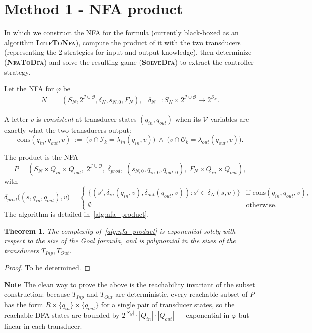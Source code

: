 \documentclass{article}
\newtheorem{theorem}{Theorem}
\newcommand{\algname}[1]{\textbf{\textsc{#1}}}
\newcommand{\Iknown}{\mathcal{I}_{k}}
\newcommand{\Oknown}{\mathcal{O}_{k}}
\newcommand{\Tin}{T_{\mathit{Inp}}}
\newcommand{\Tout}{T_{\mathit{Out}}}
\newcommand{\cons}{\mathrm{cons}}
\begin{document}
    
\section{Method 1 - NFA product}\label{nfa}
In which we construct the NFA for the formula (currently black-boxed as an algorithm \algname{LtlfToNfa}), compute the product of it with the two transducers (representing the 2 strategies for input and output knowledge), then determinize (\algname{NfaToDfa}) and solve the resulting game (\algname{SolveDfa}) to extract the controller strategy.

Let the NFA for $\varphi$ be
\begin{align*}
    N &= (S_N, 2^{\mathcal{I} \cup \mathcal{O}}, \delta_N, s_{N,0}, F_N), &
    \delta_N &: S_N \times 2^{\mathcal{I} \cup \mathcal{O}} \to 2^{S_N}.
\end{align*}

A letter $v$ is \emph{consistent} at transducer states $(q_{in}, q_{out})$ when its $\mathcal{V}$-variables are exactly what the two transducers output:
\[
    \cons(q_{in}, q_{out}, v) \;:=\;
    \big(v \cap \Iknown = \lambda_{in}(q_{in}, v)\big)
    \;\wedge\;
    \big(v \cap \Oknown = \lambda_{out}(q_{out}, v)\big).
\]

The product is the NFA
\[
    P = (S_N \times Q_{in} \times Q_{out},\; 2^{\mathcal{I} \cup \mathcal{O}},\; \delta_{prod},\; (s_{N,0}, q_{in,0}, q_{out,0}),\; F_N \times Q_{in} \times Q_{out}),
\]
with
\[
    \delta_{prod}\big((s, q_{in}, q_{out}), v\big) =
    \begin{cases}
        \{(s', \delta_{in}(q_{in}, v), \delta_{out}(q_{out}, v)) : s' \in \delta_N(s, v)\}
        & \text{if } \cons(q_{in}, q_{out}, v),\\[2pt]
        \emptyset & \text{otherwise.}
    \end{cases}
\]
The algorithm is detailed in~\cref{alg:nfa_product}.

\begin{theorem}
The complexity of~\cref{alg:nfa_product} is exponential solely with respect to the size of the Goal formula, and is polynomial in the sizes of the transducers $\Tin, \Tout$.
\end{theorem}

\begin{proof}
To be determined.
\end{proof}

\textbf{Note} The clean way to prove the above is the reachability invariant of the subset construction: because $\Tin$ and $\Tout$ are deterministic, every reachable subset of $P$ has the form $R \times \{q_{in}\} \times \{q_{out}\}$ for a single pair of transducer states, so the reachable DFA states are bounded by $2^{|S_N|} \cdot |Q_{in}| \cdot |Q_{out}|$ --- exponential in $\varphi$ but linear in each transducer.
\end{document}
